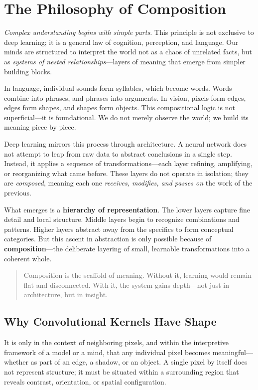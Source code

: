 \section{The Philosophy of Composition}

\textit{Complex understanding begins with simple parts.}  
This principle is not exclusive to deep learning; it is a general law of cognition, perception, and language. Our minds are structured to interpret the world not as a chaos of unrelated facts, but as \textit{systems of nested relationships}—layers of meaning that emerge from simpler building blocks.

In language, individual sounds form syllables, which become words. Words combine into phrases, and phrases into arguments. In vision, pixels form edges, edges form shapes, and shapes form objects. This compositional logic is not superficial—it is foundational. We do not merely observe the world; we build its meaning piece by piece.

Deep learning mirrors this process through architecture. A neural network does not attempt to leap from raw data to abstract conclusions in a single step. Instead, it applies a sequence of transformations—each layer refining, amplifying, or reorganizing what came before. These layers do not operate in isolation; they are \textit{composed}, meaning each one \textit{receives, modifies, and passes on} the work of the previous.

What emerges is a \textbf{hierarchy of representation}. The lower layers capture fine detail and local structure. Middle layers begin to recognize combinations and patterns. Higher layers abstract away from the specifics to form conceptual categories. But this ascent in abstraction is only possible because of \textbf{composition}—the deliberate layering of small, learnable transformations into a coherent whole.

\begin{quote}
	Composition is the scaffold of meaning. Without it, learning would remain flat and disconnected. With it, the system gains depth—not just in architecture, but in insight.
\end{quote}

\subsection{Why Convolutional Kernels Have Shape}

It is only in the context of neighboring pixels, and within the interpretive framework of a model or a mind, that any individual pixel becomes meaningful—whether as part of an edge, a shadow, or an object. A single pixel by itself does not represent structure; it must be situated within a surrounding region that reveals contrast, orientation, or spatial configuration.

